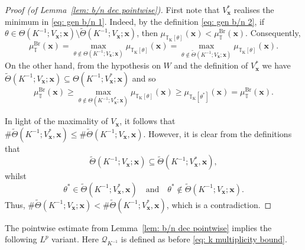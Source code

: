 \documentclass[reqno]{amsart}
\numberwithin{equation}{section}
\newcommand{\T}{\mathbb{T}}
\newcommand{\cQ}{\mathcal{Q}}
\newcommand{\bx}{\mathbf{x}}
\theoremstyle{plain}
\theoremstyle{definition}
\begin{document}
\begin{proof}[Proof (of Lemma~\ref{lem: b/n dec pointwise})]
First note that $V_{\bx}^*$ realises the minimum in \eqref{eq: gen b/n 1}. Indeed, by the definition \eqref{eq: gen b/n 2}, if $\theta \in \Theta(K^{-1}; V_{\bx}; \bx) \setminus  \widetilde{\Theta}(K^{-1}; V_{\bx}; \bx)$, then $\mu_{\T_{\mathrm{K}}[\theta]}(\bx) < \mu_{\T}^{\mathrm{Br}}(\bx)$. Consequently,
\begin{equation*}
    \mu_{\T}^{\mathrm{Br}}(\bx) =  \max_{\theta \notin \Theta(K^{-1}; V_{\bx}; \bx)} \mu_{\T_{\mathrm{K}}[\theta]}(\bx) = \max_{\theta \notin \widetilde{\Theta}(K^{-1}; V_{\bx}; \bx)} \mu_{\T_{\mathrm{K}}[\theta]}(\bx).
\end{equation*}
On the other hand, from the hypothesis on $W$ and the definition of $V_{\bx}^*$ we have $\widetilde{\Theta}(K^{-1}; V_{\bx}; \bx) \subseteq \Theta(K^{-1}; V_{\bx}^*; \bx)$ and so
\begin{equation*}
    \mu_{\T}^{\mathrm{Br}}(\bx) \geq \max_{\theta \notin \Theta(K^{-1}; V_{\bx}^*; \bx)} \mu_{\T_{\mathrm{K}}[\theta]}(\bx) \geq \mu_{\T_{\mathrm{K}}[\theta^*]}(\bx) = \mu_{\T}^{\mathrm{Br}}(\bx). 
\end{equation*}

In light of the maximality of $V_{\bx}$, it follows that $\# \widetilde{\Theta}(K^{-1}; V_{\bx}^*, \bx) \leq \# \widetilde{\Theta}(K^{-1}; V_{\bx},\bx)$. However, it is clear from the definitions that 
\begin{equation*}
    \widetilde{\Theta}(K^{-1}; V_{\bx}; \bx) \subseteq \widetilde{\Theta}(K^{-1}; V_{\bx}^*, \bx), 
\end{equation*}
whilst
\begin{equation*}
    \theta^* \in \widetilde{\Theta}(K^{-1}; V_{\bx}^*, \bx) \quad \textrm{and} \quad \theta^* \notin \widetilde{\Theta}(K^{-1}; V_{\bx}; \bx).
\end{equation*}
 Thus, $\# \widetilde{\Theta}(K^{-1}; V_{\bx}; \bx) < \# \widetilde{\Theta}(K^{-1}; V_{\bx}^*, \bx)$, which is a contradiction. 
\end{proof}

The pointwise estimate from Lemma~\ref{lem: b/n dec pointwise} implies the following $L^p$ variant. Here $\cQ_{K^{-1}}$ is defined as before \eqref{eq: k multiplicity bound}. 
\end{document}
